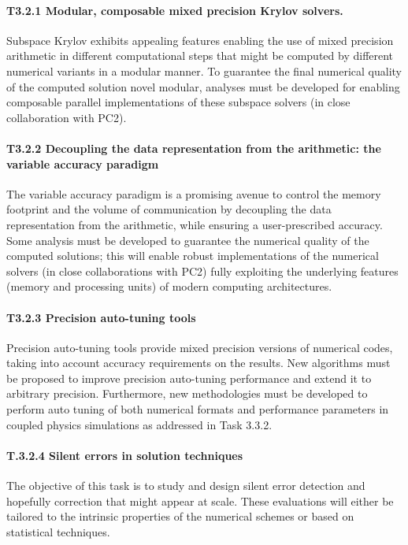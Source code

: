 \paragraph*{T3.2.1 Modular, composable mixed precision Krylov solvers. }

Subspace Krylov exhibits appealing
features enabling the use of mixed precision arithmetic in different computational steps that might be
computed by different numerical variants in a modular manner. To guarantee the final numerical
quality of the computed solution novel modular, analyses must be developed for enabling composable
parallel implementations of these subspace solvers (in close collaboration with PC2).

\paragraph*{T3.2.2 Decoupling the data representation from the arithmetic: the variable accuracy paradigm}

The variable accuracy paradigm is a promising avenue to control the memory footprint and the
volume of communication by decoupling the data representation from the arithmetic, while ensuring a
user-prescribed accuracy. Some analysis must be developed to guarantee the numerical quality of the
computed solutions; this will enable robust implementations of the numerical solvers (in close
collaborations with PC2) fully exploiting the underlying features (memory and processing units) of
modern computing architectures.
\paragraph*{T3.2.3 Precision auto-tuning tools}
 Precision auto-tuning tools provide mixed precision versions of
numerical codes, taking into account accuracy requirements on the results. New algorithms must be
proposed to improve precision auto-tuning performance and extend it to arbitrary precision.
Furthermore, new methodologies must be developed to perform auto tuning of both numerical formats
and performance parameters in coupled physics simulations as addressed in Task 3.3.2.
\paragraph*{T.3.2.4 Silent errors in solution techniques}
 The objective of this task is to study and design silent
error detection and hopefully correction that might appear at scale. These evaluations will either be
tailored to the intrinsic properties of the numerical schemes or based on statistical techniques.

